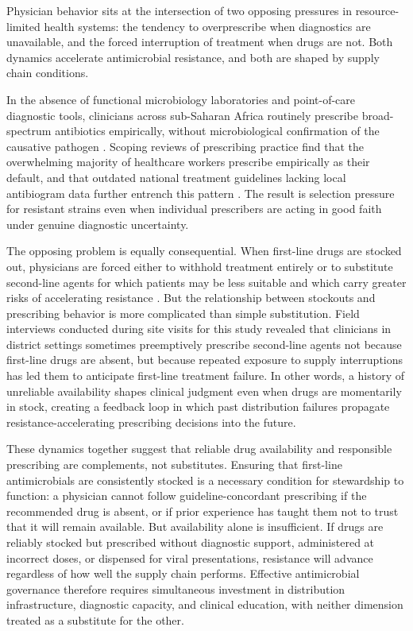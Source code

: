 \documentclass{article}
\begin{document}
Physician behavior sits at the intersection of two opposing pressures in resource-limited health systems: the tendency to overprescribe when diagnostics are unavailable, and the forced interruption of treatment when drugs are not. Both dynamics accelerate antimicrobial resistance, and both are shaped by supply chain conditions.

In the absence of functional microbiology laboratories and point-of-care diagnostic tools, clinicians across sub-Saharan Africa routinely prescribe broad-spectrum antibiotics empirically, without microbiological confirmation of the causative pathogen \cite{ehsan2025}. Scoping reviews of prescribing practice find that the overwhelming majority of healthcare workers prescribe empirically as their default, and that outdated national treatment guidelines lacking local antibiogram data further entrench this pattern \cite{chigome2025}. The result is selection pressure for resistant strains even when individual prescribers are acting in good faith under genuine diagnostic uncertainty.

The opposing problem is equally consequential. When first-line drugs are stocked out, physicians are forced either to withhold treatment entirely or to substitute second-line agents for which patients may be less suitable and which carry greater risks of accelerating resistance \cite{lax13}. But the relationship between stockouts and prescribing behavior is more complicated than simple substitution. Field interviews conducted during site visits for this study revealed that clinicians in district settings sometimes preemptively prescribe second-line agents not because first-line drugs are absent, but because repeated exposure to supply interruptions has led them to anticipate first-line treatment failure. In other words, a history of unreliable availability shapes clinical judgment even when drugs are momentarily in stock, creating a feedback loop in which past distribution failures propagate resistance-accelerating prescribing decisions into the future.

These dynamics together suggest that reliable drug availability and responsible prescribing are complements, not substitutes. Ensuring that first-line antimicrobials are consistently stocked is a necessary condition for stewardship to function: a physician cannot follow guideline-concordant prescribing if the recommended drug is absent, or if prior experience has taught them not to trust that it will remain available. But availability alone is insufficient. If drugs are reliably stocked but prescribed without diagnostic support, administered at incorrect doses, or dispensed for viral presentations, resistance will advance regardless of how well the supply chain performs. Effective antimicrobial governance therefore requires simultaneous investment in distribution infrastructure, diagnostic capacity, and clinical education, with neither dimension treated as a substitute for the other.
\end{document}
